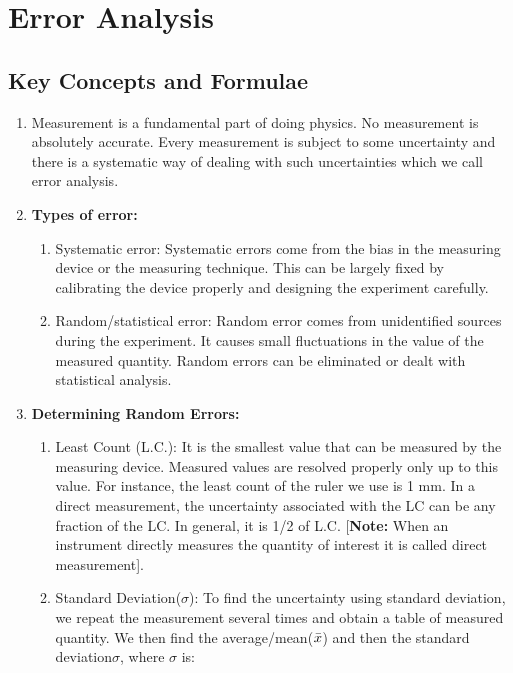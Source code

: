\chapter{Error Analysis}

\pagestyle{fancy}
\fancyhf{}
\fancyhead[OC]{\leftmark}
\fancyhead[EC]{\rightmark}
\cfoot{\thepage}

\section{Key Concepts and Formulae}
\begin{enumerate}
    \item Measurement is a fundamental part of doing physics. No measurement is absolutely accurate. Every measurement is subject to some uncertainty and there is a systematic way of dealing with such uncertainties which we call error analysis. 
    \item \textbf{Types of error:}
    \begin{enumerate}
        \item Systematic error: Systematic errors come from the bias in the measuring device or the measuring technique. This can be largely fixed by calibrating the device properly and designing the experiment carefully. 
        \item Random/statistical error: Random error comes from unidentified sources during the experiment. It causes small fluctuations in the value of the measured quantity. Random errors can be eliminated or dealt with statistical analysis.  
    \end{enumerate}
    \item \textbf{Determining Random Errors:}
    \begin{enumerate}
        \item Least Count (L.C.): It is the smallest value that can be measured by the measuring device. Measured values are resolved properly only up to this value. For instance, the least count of the ruler we use is 1 mm. In a direct measurement, the uncertainty associated with the LC can be any fraction of the LC. In general, it is 1/2 of L.C. [\textbf{Note:} When an instrument directly measures the quantity of interest it is called direct measurement].   
        \item Standard Deviation($\sigma$): To find the uncertainty using standard deviation, we repeat the measurement several times and obtain a table of measured quantity. We then find the average/mean($\Bar{x}$) and then the standard deviation$\sigma$, where $\sigma$ is:

\end{enumerate}
\end{enumerate}
